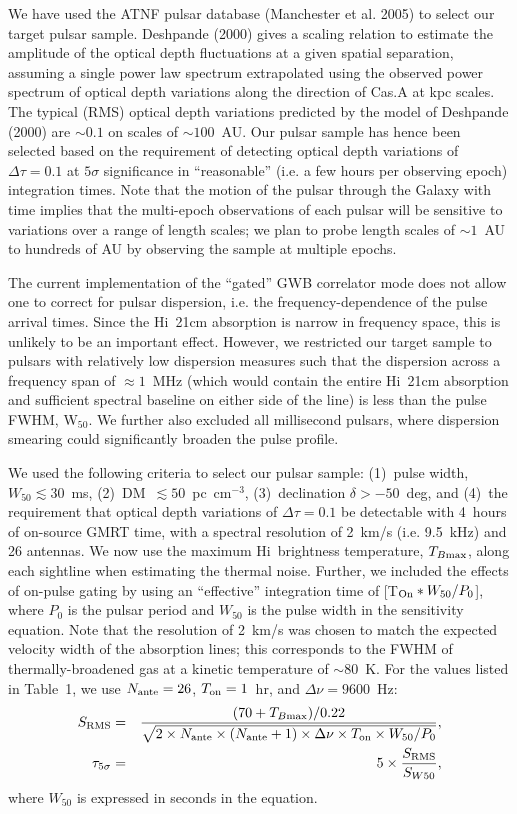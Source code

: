 \documentclass[11pt]{article}
\newcommand{\hi}{H{\sc i}}
\begin{document}
We have used the ATNF pulsar database (Manchester et al. 2005) to select our 
target pulsar sample. Deshpande (2000) gives a scaling relation to estimate 
the amplitude of the optical depth fluctuations at a given spatial separation, assuming a single power law spectrum extrapolated using the observed power spectrum of optical depth variations along the direction of Cas.A at kpc scales. The typical (RMS) optical depth variations predicted by the model of Deshpande (2000) are $\sim 0.1$ on scales of $\sim 100$~AU. Our pulsar sample has hence been selected based on the requirement of detecting optical depth variations of $\Delta \tau = 0.1$ at $5\sigma$ significance in ``reasonable'' (i.e. a few hours per observing epoch) integration times.  Note that the motion of the pulsar through the Galaxy with time implies that the multi-epoch observations of each pulsar will be sensitive to variations over a range of length scales; we plan to probe length scales of $\sim 1$~AU to hundreds of AU by observing the sample at multiple epochs. 

The current implementation of the ``gated'' GWB correlator mode does not allow one to correct for pulsar dispersion, i.e. the frequency-dependence of the pulse arrival times. Since the \hi~21cm absorption is narrow in frequency space, this is unlikely to be an important effect. However, we restricted our target sample to pulsars with relatively low dispersion measures such that the dispersion across a frequency span of $\approx 1$~MHz (which would contain the entire \hi~21cm absorption and sufficient spectral baseline on either side of the line) is less than the pulse FWHM, W$_{50}$. We further also excluded all millisecond pulsars, where dispersion smearing could significantly broaden the pulse profile.

We used the following criteria to select our pulsar sample: (1)~pulse width, $W_{50} \lesssim 30$~ms, (2)~DM~$\lesssim 50$~pc~cm$^{-3}$, (3)~declination $\delta > -50$~deg, and (4)~the requirement that optical depth variations of $\Delta \tau = 0.1$ be detectable with 4~hours of on-source GMRT time, with a spectral resolution of 2~km/s (i.e. 9.5~kHz) and 26 antennas. We now use the maximum \hi~brightness temperature, $T_{B{\rm max}}$, along each sightline when estimating the thermal noise. Further, we included the effects of on-pulse
gating by using an ``effective'' integration time of [T$_{\rm On}*W_{50}/P_0$], where $P_0$ is the pulsar period and $W_{50}$ is the pulse width in the sensitivity equation. Note that the resolution of 2~km/s was chosen to match the expected velocity width of the absorption lines; this corresponds to the FWHM of thermally-broadened gas at a kinetic temperature of $\sim 80$~K. For the values listed in Table~1, we use $N_{\rm ante}=26$, $T_{\rm on}=1$~hr, and $\Delta\nu=9600$~Hz:
\begin{eqnarray}
S_{\rm RMS} &=& \frac{(70+T_{B{\rm max}})/0.22}
{\sqrt{2 \times N_{\rm ante} \times (N_{\rm ante}+1) \times \Delta\nu \times T_{\rm on} \times W_{50}/P_0}} , \\
\tau_{5\sigma} &=& 5 \times \frac{S_{\rm RMS}}{S_{W50}} ,
\end{eqnarray}
where $W_{50}$ is expressed in seconds in the equation.
\end{document}
